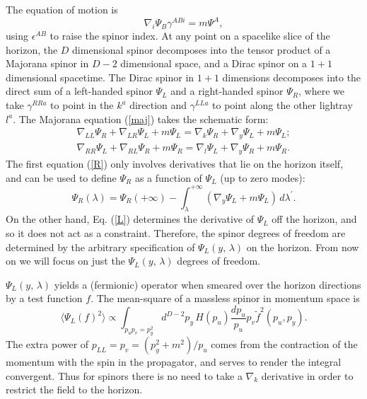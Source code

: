 \documentclass{article}
\begin{document}
The equation of motion is
\begin{equation}\label{maj}
\nabla_i \Psi_B \gamma^{ABi} = m \Psi^A,
\end{equation}
using $\epsilon^{AB}$ to raise the spinor index.  At any point on a spacelike slice of the horizon, the $D$ dimensional spinor decomposes into the tensor product of a Majorana spinor in $D - 2$ dimensional space, and a Dirac spinor on a $1 + 1$ dimensional spacetime.  The Dirac spinor in $1 + 1$ dimensions decomposes into the direct sum of a left-handed spinor $\Psi_L$ and a right-handed spinor $\Psi_R$, where we take $\gamma^{RRa}$ to point in the $k^a$ direction and $\gamma^{LLa}$ to point along the other lightray $l^a$.  The Majorana equation (\ref{maj}) takes the schematic form:
\begin{eqnarray}
\nabla_{LL} \Psi_R + \nabla_{LR} \Psi_L + m \Psi_L
= \nabla_k \Psi_R + \nabla_y \Psi_L + m \Psi_L \label{L}; \\
\nabla_{RR} \Psi_L + \nabla_{RL} \Psi_R + m \Psi_R
= \nabla_l \Psi_L + \nabla_y \Psi_R + m \Psi_R.\label{R}
\end{eqnarray}
The first equation (\ref{R}) only involves derivatives that lie on the horizon itself, and can be used to define $\Psi_R$ as a function of $\Psi_L$ (up to zero modes):
\begin{equation}
\Psi_R(\lambda) =
\Psi_R(+\infty) - \int_\lambda^{+\infty} (\nabla_y \Psi_L + m \Psi_L)\,d\lambda^\prime.
\end{equation}
On the other hand, Eq. (\ref{L}) determines the derivative of $\Psi_L$ off the horizon, and so it does not act as a constraint.  Therefore, the spinor degrees of freedom are determined by the arbitrary specification of $\Psi_L(y,\,\lambda)$ on the horizon.  From now on we will focus on just the $\Psi_L(y,\,\lambda)$ degrees of freedom.

$\Psi_L(y,\,\lambda)$ yields a (fermionic) operator when smeared over the horizon directions by a test function $f$.  The mean-square of a massless spinor in momentum space is
\begin{equation}
\langle \Psi_L(f)^2 \rangle \propto
\int_{p_u p_v = p_y^2} d^{D-2}p_y\,H(p_u)\frac{dp_u}{p_u} p_v \tilde{f}^2(p_u, p_y).
\end{equation}
The extra power of $p_{LL} = p_v = (p_y^2 + m^2)/ p_u$ comes from the contraction of the momentum with the spin in the propagator, and serves to render the integral convergent.  Thus for spinors there is no need to take a $\nabla_k$ derivative in order to restrict the field to the horizon.
\end{document}
